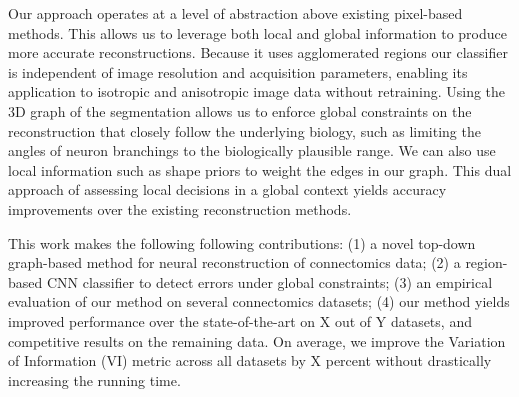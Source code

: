 Our approach operates at a level of abstraction above existing pixel-based methods. This allows us to leverage both local and global information to produce more accurate reconstructions. Because it uses agglomerated regions our classifier is independent of image resolution and acquisition parameters, enabling its application to isotropic and anisotropic image data without retraining. Using the 3D graph of the segmentation allows us to enforce global constraints on the reconstruction that closely follow the underlying biology, such as limiting the angles of neuron branchings to the biologically plausible range. We can also use local information such as shape priors to weight the edges in our graph. This dual approach of assessing local decisions in a global context yields accuracy improvements over the existing reconstruction methods.

This work makes the following following contributions: (1) a novel top-down graph-based method for neural reconstruction of connectomics data; (2) a region-based CNN classifier to detect errors under global constraints; (3) an empirical evaluation of our method on several connectomics datasets; (4) our method yields improved performance over the state-of-the-art on X out of Y datasets, and competitive results on the remaining data. On average, we improve the Variation of Information (VI) metric across all datasets by X percent without drastically increasing the running time.
